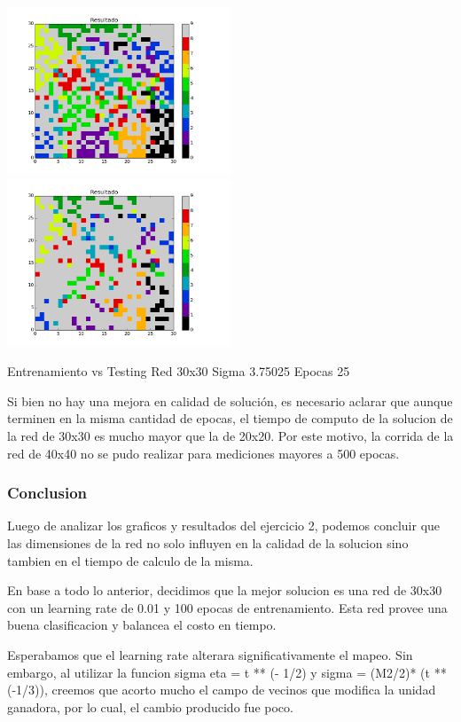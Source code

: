 \includegraphics[width=0.5\textwidth]{img/Ej2_Epocas/train_M_30_sigma_3_75025_epocas_25}
\includegraphics[width=0.5\textwidth]{img/Ej2_Epocas/test_M_30_sigma_3_75025_epocas_25}
{\center \footnotesize Entrenamiento vs Testing Red 30x30 Sigma 3.75025 Epocas 25\par}


Si bien no hay una mejora en calidad de soluci\'on, es necesario aclarar que aunque terminen en la misma cantidad de epocas, el tiempo de computo de la solucion de la red de 30x30 es mucho mayor que la de 20x20. Por este motivo, la corrida de la red de 40x40 no se pudo realizar para mediciones mayores a 500 epocas.

\subsubsection{Conclusion}

Luego de analizar los graficos y resultados del ejercicio 2, podemos concluir que las dimensiones de la red no solo influyen en la calidad de la solucion sino tambien en el tiempo de calculo de la misma. 

En base a todo lo anterior, decidimos que la mejor solucion es una red de 30x30 con un learning rate de 0.01 y 100 epocas de entrenamiento. Esta red provee una buena clasificacion y balancea el costo en tiempo.

Esperabamos que el learning rate alterara significativamente el mapeo. Sin embargo, al utilizar la funcion sigma
eta = t ** (- 1/2) y sigma = (M2/2)* (t ** (-1/3)), creemos que acorto mucho el campo de vecinos que modifica la unidad ganadora, por lo cual, el cambio producido fue poco.

